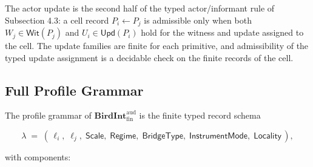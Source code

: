 \documentclass[11pt]{article}
\theoremstyle{definition}
\begin{document}
The actor update is the second half of the typed actor/informant rule of Subsection 4.3: a cell record \(P_{i}\leftarrow P_{j}\) is admissible only when both \(W_{j}\in\mathsf{Wit}(P_{j})\) and \(U_{i}\in\mathsf{Upd}(P_{i})\) hold for the witness and update assigned to the cell. The update families are finite for each primitive, and admissibility of the typed update assignment is a decidable check on the finite records of the cell.

\subsection{Full Profile Grammar}

The profile grammar of \(\mathbf{BirdInt}^{\mathrm{aud}}_{\mathrm{fin}}\) is the finite typed record schema

\[
\lambda\;=\;(\,\ell_{i},\;\ell_{j},\;\mathsf{Scale},\;\mathsf{Regime},\;\mathsf{BridgeType},\;\mathsf{InstrumentMode},\;\mathsf{Locality}\,),
\]

with components:
\end{document}
